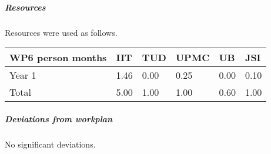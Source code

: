 

\subparagraph{Resources}

Resources were used as follows.

\begin{center}
\begin{tabular}{|C{1.5cm}|C{1.5cm}|C{1.5cm}|C{2cm}|C{2cm}|C{2cm}|}
\hline
\footnotesize \textbf{WP6 person months}& \footnotesize \textbf{IIT}&\footnotesize \textbf{TUD}&\footnotesize \textbf{UPMC}& \footnotesize \textbf{UB} &\footnotesize \textbf{JSI}\\ \hline
\footnotesize Year 1 &  1.46 & 0.00 & 0.25 & 0.00 & 0.10      \\  \hline
\footnotesize Total &  5.00	 & 1.00 & 1.00 & 0.60 & 1.00 \\ \hline
\end{tabular}
\end{center}

\subparagraph{Deviations from workplan} 
No significant deviations. 